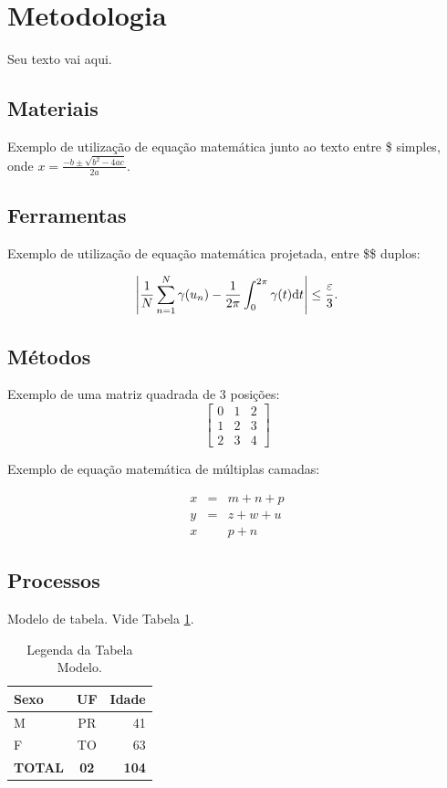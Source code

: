 \documentclass[journal]{IEEEtran}									%
\begin{document}
\section{Metodologia}
Seu texto vai aqui.

\subsection{Materiais}
Exemplo de utilização de equação matemática junto ao texto entre \$ simples, onde $x=\frac{-b\pm\sqrt{b^2-4ac}}{2a}$.

\subsection{Ferramentas}
Exemplo de utilização de equação matemática projetada, entre \$\$ duplos:

$$\left|{1\over N}\sum_{n=1}^N \gamma(u_n)-{1\over 2\pi}\int_0^{2\pi}\gamma(t){\rm d}t\right| \le {\varepsilon\over 3}.$$

\subsection{Métodos}
Exemplo de uma matriz quadrada de 3 posições:
$$\begin{bmatrix}
	0 & 1 & 2 \\ 
	1 & 2 & 3 \\ 
	2 & 3 & 4
\end{bmatrix}$$

Exemplo de equação matemática de múltiplas camadas:

	\begin{eqnarray}
		x & = & m + n + p	\nonumber\\ %
		y&=&z + w + u		\\ 			%
		x& &p+n							%
	\end{eqnarray}

\subsection{Processos}

Modelo de tabela. Vide Tabela \ref{t:modelo}.

\begin{table}[h] 
	\centering
	\caption{Legenda da Tabela Modelo.}
	\begin{tabular}{l|cr}
		\hline
			{\bf Sexo} & {\bf UF} & {\bf Idade}\\
		\hline
			M  & PR & 41 \\
			F  & TO & 63 \\
		\hline
			{\bf TOTAL} & {\bf 02} & {\bf 104}\\
		\hline
		\end{tabular}
	\label{t:modelo}
\end{table}
\end{document}
